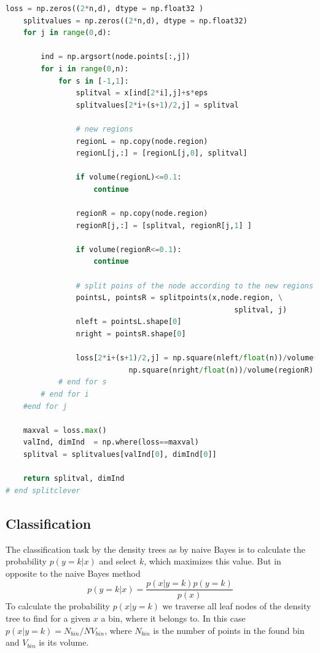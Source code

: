 \documentclass{article}
\begin{document}
\begin{lstlisting}[language=Python]
    loss = np.zeros((2*n,d), dtype = np.float32 )
    splitvalues = np.zeros((2*n,d), dtype = np.float32)
    for j in range(0,d):
        
        ind = np.argsort(node.points[:,j])
        for i in range(0,n):
            for s in [-1,1]:
                splitval = x[ind[2*i],j]+s*eps
                splitvalues[2*i+(s+1)/2,j] = splitval
                
                # new regions
                regionL = np.copy(node.region)
                regionL[j,:] = [regionL[j,0], splitval]
                
                if volume(regionL)<=0.1:
                    continue
                
                regionR = np.copy(node.region)       
                regionR[j,:] = [splitval, regionR[j,1] ]           
                
                if volume(regionR<=0.1):
                    continue
                
                # split poins of the node according to the new regions
                pointsL, pointsR = splitpoints(x,node.region, \
                                                    splitval, j)
                nleft = pointsL.shape[0]
                nright = pointsR.shape[0]
                    
                loss[2*i+(s+1)/2,j] = np.square(nleft/float(n))/volume(regionL) + \
                            np.square(nright/float(n))/volume(regionR)
            # end for s
        # end for i    
    #end for j                      

    maxval = loss.max()
    valInd, dimInd  = np.where(loss==maxval)       
    splitval = splitvalues[valInd[0], dimInd[0]]        
    
    return splitval, dimInd
# end splitclever
\end{lstlisting}

\subsection{Classification}

The classification task by the density trees as by naive Bayes is to calculate the probability $p(y=k|x)$ and select $k$, which maximizes this value. But in opposite to the naive Bayes method 
$$p(y=k|x)=\frac{p(x|y=k) p(y=k)}{p(x)}$$ To calculate the probability $p(x|y=k)$ we traverse all leaf nodes of the density tree to find for a given $x$ a bin, where it belongs to. In this case $p(x|y=k) = N_{bin}/{NV_{bin}}$, where $N_{bin}$ is the number of points in the found bin and $V_{bin}$ is its volume.
\end{document}
